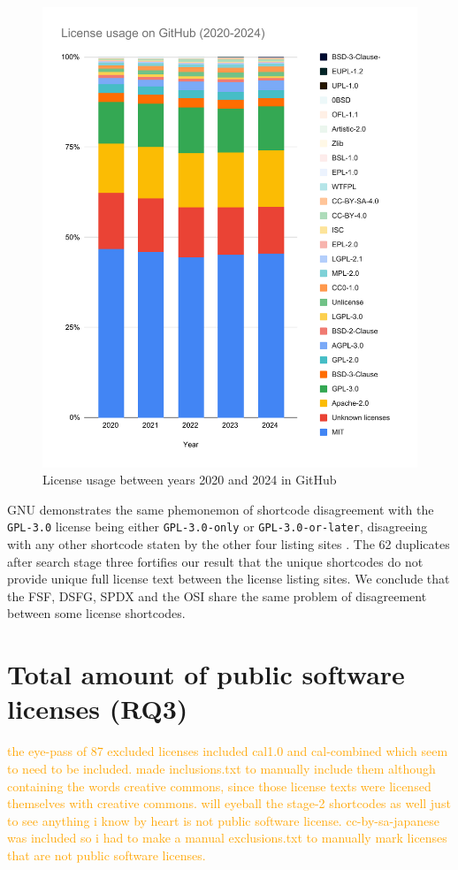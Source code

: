\begin{figure}
	\centering
	\includegraphics[scale=0.76]{figures/figure-3-5.pdf}
	\caption{License usage between years 2020 and 2024 in GitHub}
	\label{fig:3-5}
\end{figure}
GNU demonstrates the same phemonemon of shortcode disagreement with the \texttt{GPL-3.0} license being either \texttt{GPL-3.0-only} or \texttt{GPL-3.0-or-later}, disagreeing with any other shortcode staten by the other four listing sites \citep{gnu:licenselist}. The 62 duplicates after search stage three fortifies our result that the unique shortcodes do not provide unique full license text between the license listing sites. We conclude that the FSF, DSFG, SPDX and the OSI share the same problem of disagreement between some license shortcodes.

\section{Total amount of public software licenses (RQ3)}
\textcolor{orange}{the eye-pass of 87 excluded licenses included cal1.0 and cal-combined which seem to need to be included. made inclusions.txt to manually include them although containing the words creative commons, since those license texts were licensed themselves with creative commons. will eyeball the stage-2 shortcodes as well just to see anything i know by heart is not public software license. cc-by-sa-japanese was included so i had to make a manual exclusions.txt to manually mark licenses that are not public software licenses.}

